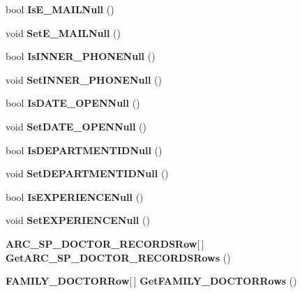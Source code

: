 \begin{CompactItemize}
\item 
bool \textbf{IsE\_\-MAILNull} ()\label{class_automatic_medical_system_1_1_data_set2_1_1_d_o_c_t_o_r_s_row_3797d542ff258a398cf9b4ac6bf1b377}

\item 
void \textbf{SetE\_\-MAILNull} ()\label{class_automatic_medical_system_1_1_data_set2_1_1_d_o_c_t_o_r_s_row_1d99f681cbcd27a3aa8b3f338e5c71c4}

\item 
bool \textbf{IsINNER\_\-PHONENull} ()\label{class_automatic_medical_system_1_1_data_set2_1_1_d_o_c_t_o_r_s_row_18c054aba89522cea06719ca255a1628}

\item 
void \textbf{SetINNER\_\-PHONENull} ()\label{class_automatic_medical_system_1_1_data_set2_1_1_d_o_c_t_o_r_s_row_f62d86f3725325bc7881e310f26b98c8}

\item 
bool \textbf{IsDATE\_\-OPENNull} ()\label{class_automatic_medical_system_1_1_data_set2_1_1_d_o_c_t_o_r_s_row_83e410ec221e0f3f78345578ad0fc8e2}

\item 
void \textbf{SetDATE\_\-OPENNull} ()\label{class_automatic_medical_system_1_1_data_set2_1_1_d_o_c_t_o_r_s_row_ee9641c5620c43ab7e20389314419f8b}

\item 
bool \textbf{IsDEPARTMENTIDNull} ()\label{class_automatic_medical_system_1_1_data_set2_1_1_d_o_c_t_o_r_s_row_544884fc7061a44f1e59848c49048adf}

\item 
void \textbf{SetDEPARTMENTIDNull} ()\label{class_automatic_medical_system_1_1_data_set2_1_1_d_o_c_t_o_r_s_row_ac5cf555e008de3ab4c86a488a8ddbd4}

\item 
bool \textbf{IsEXPERIENCENull} ()\label{class_automatic_medical_system_1_1_data_set2_1_1_d_o_c_t_o_r_s_row_1afb5d5d4bddfc6d143f5e33e4fa9366}

\item 
void \textbf{SetEXPERIENCENull} ()\label{class_automatic_medical_system_1_1_data_set2_1_1_d_o_c_t_o_r_s_row_1c04e5d8b62fd828ab00a4e707270314}

\item 
{\bf ARC\_\-SP\_\-DOCTOR\_\-RECORDSRow}[$\,$] \textbf{GetARC\_\-SP\_\-DOCTOR\_\-RECORDSRows} ()\label{class_automatic_medical_system_1_1_data_set2_1_1_d_o_c_t_o_r_s_row_5acf425e7e0f7ac004b9939a412570bc}

\item 
{\bf FAMILY\_\-DOCTORRow}[$\,$] \textbf{GetFAMILY\_\-DOCTORRows} ()\label{class_automatic_medical_system_1_1_data_set2_1_1_d_o_c_t_o_r_s_row_554af89489a635687a0b8e485893bced}

\end{CompactItemize}
